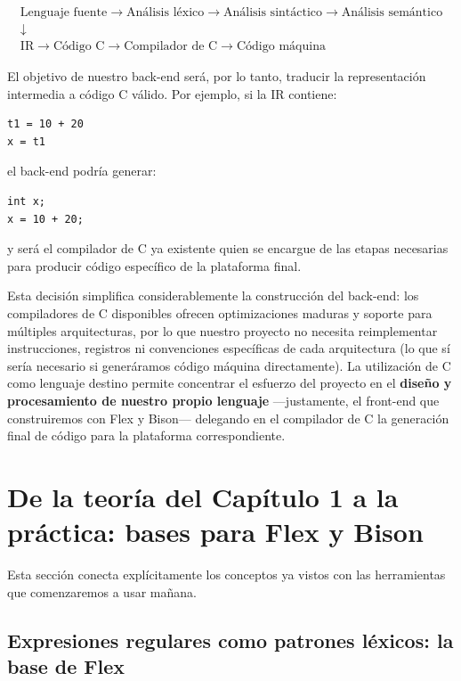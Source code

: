 \documentclass[11pt,a4paper]{article}
\begin{document}
\[
\begin{array}{c}
\text{Lenguaje fuente}
\rightarrow
\text{Análisis léxico}
\rightarrow
\text{Análisis sintáctico}
\rightarrow
\text{Análisis semántico}
\\[6pt]
\downarrow \\[6pt]
\text{IR}
\rightarrow
\text{Código C}
\rightarrow
\text{Compilador de C}
\rightarrow
\text{Código máquina}
\end{array}
\]

El objetivo de nuestro back-end será, por lo tanto, traducir la representación intermedia a
código C válido. Por ejemplo, si la IR contiene:

\begin{lstlisting}
t1 = 10 + 20
x = t1
\end{lstlisting}

el back-end podría generar:

\begin{lstlisting}
int x;
x = 10 + 20;
\end{lstlisting}

y será el compilador de C ya existente quien se encargue de las etapas necesarias para producir
código específico de la plataforma final.

Esta decisión simplifica considerablemente la construcción del back-end: los compiladores de C
disponibles ofrecen optimizaciones maduras y soporte para múltiples arquitecturas, por lo que
nuestro proyecto no necesita reimplementar instrucciones, registros ni convenciones específicas
de cada arquitectura (lo que sí sería necesario si generáramos código máquina directamente).
La utilización de C como lenguaje destino permite concentrar el esfuerzo del proyecto en el
\textbf{diseño y procesamiento de nuestro propio lenguaje} —justamente, el front-end que
construiremos con Flex y Bison— delegando en el compilador de C la generación final de código
para la plataforma correspondiente.

\section{De la teoría del Capítulo 1 a la práctica: bases para Flex y Bison}
\label{sec:flex-bison}

Esta sección conecta explícitamente los conceptos ya vistos con las herramientas que
comenzaremos a usar mañana.

\subsection{Expresiones regulares como patrones léxicos: la base de Flex}
\end{document}
